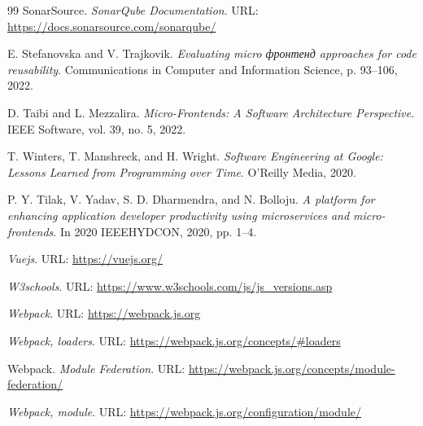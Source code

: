 \begin{thebibliography}{99}
    SonarSource.
    \textit{SonarQube Documentation}.
    URL: \url{https://docs.sonarsource.com/sonarqube/}

    E. Stefanovska and V. Trajkovik.
    \textit{Evaluating micro фронтенд approaches for code reusability}.
    Communications in Computer and Information Science, p. 93–106, 2022.

    D. Taibi and L. Mezzalira.
    \textit{Micro-Frontends: A Software Architecture Perspective}.
    IEEE Software, vol. 39, no. 5, 2022.

    T. Winters, T. Manshreck, and H. Wright.
    \textit{Software Engineering at Google: Lessons Learned from Programming over Time}.
    O'Reilly Media, 2020.

    P. Y. Tilak, V. Yadav, S. D. Dharmendra, and N. Bolloju.
    \textit{A platform for enhancing application developer productivity using microservices and micro-frontends}.
    In 2020 IEEEHYDCON, 2020, pp. 1–4.

    \textit{Vuejs}.
    URL: \url{https://vuejs.org/}

    \textit{W3schools}.
    URL: \url{https://www.w3schools.com/js/js_versions.asp}

    \textit{Webpack}.
    URL: \url{https://webpack.js.org}

    \textit{Webpack, loaders}.
    URL: \url{https://webpack.js.org/concepts/\#loaders}

    Webpack.
    \textit{Module Federation}.
    URL: \url{https://webpack.js.org/concepts/module-federation/}

    \textit{Webpack, module}.
    URL: \url{https://webpack.js.org/configuration/module/}

\end{thebibliography}
